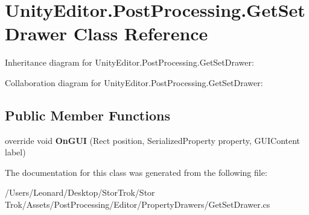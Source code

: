 \hypertarget{class_unity_editor_1_1_post_processing_1_1_get_set_drawer}{}\section{Unity\+Editor.\+Post\+Processing.\+Get\+Set\+Drawer Class Reference}
\label{class_unity_editor_1_1_post_processing_1_1_get_set_drawer}


Inheritance diagram for Unity\+Editor.\+Post\+Processing.\+Get\+Set\+Drawer\+:


Collaboration diagram for Unity\+Editor.\+Post\+Processing.\+Get\+Set\+Drawer\+:
\subsection*{Public Member Functions}
\begin{DoxyCompactItemize}
\item 
\mbox{\label{class_unity_editor_1_1_post_processing_1_1_get_set_drawer_a4223a2db683fc9ab228eabdc3af38a98}} 
override void {\bfseries On\+G\+UI} (Rect position, Serialized\+Property property, G\+U\+I\+Content label)
\end{DoxyCompactItemize}


The documentation for this class was generated from the following file\+:\begin{DoxyCompactItemize}
\item 
/\+Users/\+Leonard/\+Desktop/\+Stor\+Trok/\+Stor Trok/\+Assets/\+Post\+Processing/\+Editor/\+Property\+Drawers/Get\+Set\+Drawer.\+cs\end{DoxyCompactItemize}
